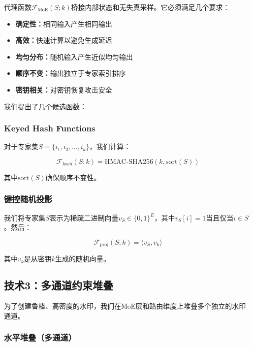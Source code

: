 \documentclass[letterpaper,twocolumn,10pt]{article}
\begin{document}
代理函数$\mathcal{F}_{\text{MoE}}(S; k)$桥接内部状态和无失真采样。它必须满足几个要求：

\begin{itemize}
\item \textbf{确定性：}相同输入产生相同输出
\item \textbf{高效：}快速计算以避免生成延迟
\item \textbf{均匀分布：}随机输入产生近似均匀输出
\item \textbf{顺序不变：}输出独立于专家索引排序
\item \textbf{密钥相关：}对密钥恢复攻击安全
\end{itemize}

我们提出了几个候选函数：

\subsubsection{Keyed Hash Functions}

对于专家集$S = \{i_1, i_2, \ldots, i_k\}$，我们计算：

\begin{equation}
\mathcal{F}_{\text{hash}}(S; k) = \text{HMAC-SHA256}(k, \text{sort}(S))
\end{equation}

其中$\text{sort}(S)$确保顺序不变性。

\subsubsection{键控随机投影}

我们将专家集$S$表示为稀疏二进制向量$v_S \in \{0,1\}^E$，其中$v_S[i] = 1$当且仅当$i \in S$。然后：

\begin{equation}
\mathcal{F}_{\text{proj}}(S; k) = \langle v_S, v_k \rangle
\end{equation}

其中$v_k$是从密钥$k$生成的随机向量。

\subsection{技术3：多通道约束堆叠}

为了创建鲁棒、高密度的水印，我们在MoE层和路由维度上堆叠多个独立的水印通道。

\subsubsection{水平堆叠（多通道）}
\end{document}
